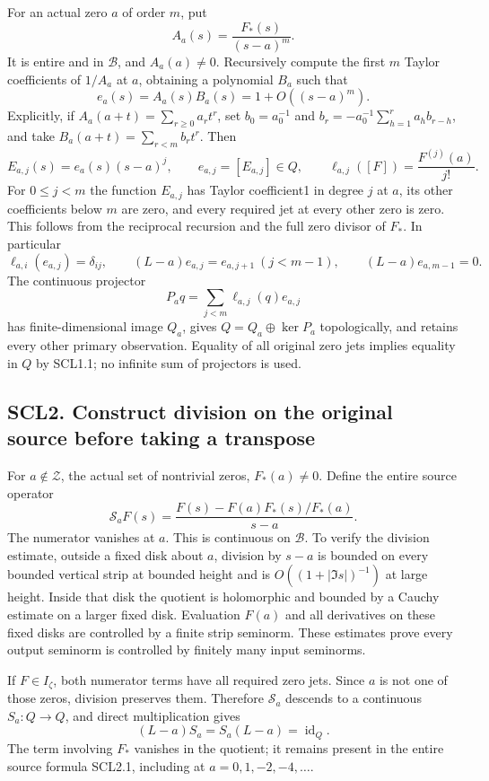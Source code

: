 For an actual zero \(a\) of order \(m\), put \[
 A_a(s)=\frac{F_*(s)}{(s-a)^m}.
\] It is entire and in \(\mathcal B\), and \(A_a(a)\ne0\). Recursively
compute the first \(m\) Taylor coefficients of \(1/A_a\) at \(a\),
obtaining a polynomial \(B_a\) such that \[
 e_a(s)=A_a(s)B_a(s)=1+O((s-a)^m).
\] Explicitly, if \(A_a(a+t)=\sum_{r\ge0}a_rt^r\), set \(b_0=a_0^{-1}\)
and \(b_r=-a_0^{-1}\sum_{h=1}^ra_hb_{r-h}\), and take
\(B_a(a+t)=\sum_{r<m}b_rt^r\). Then \[
 E_{a,j}(s)=e_a(s)(s-a)^j,\qquad
 e_{a,j}=[E_{a,j}]\in Q,\qquad
 \ell_{a,j}([F])=\frac{F^{(j)}(a)}{j!}.
 \tag{SCL1.6}
\] For \(0\le j<m\) the function \(E_{a,j}\) has Taylor coefficient1 in
degree \(j\) at \(a\), its other coefficients below \(m\) are zero, and
every required jet at every other zero is zero. This follows from the
reciprocal recursion and the full zero divisor of \(F_*\). In particular
\[
 \ell_{a,i}(e_{a,j})=\delta_{ij},\qquad
 (L-a)e_{a,j}=e_{a,j+1}\ (j<m-1),\qquad
 (L-a)e_{a,m-1}=0.
 \tag{SCL1.7}
\] The continuous projector \[
 P_aq=\sum_{j<m}\ell_{a,j}(q)e_{a,j}
 \tag{SCL1.8}
\] has finite-dimensional image \(Q_a\), gives \(Q=Q_a\oplus\ker P_a\)
topologically, and retains every other primary observation. Equality of
all original zero jets implies equality in \(Q\) by SCL1.1; no infinite
sum of projectors is used.

\subsection{SCL2. Construct division on the original source before
taking a
transpose}\label{scl2.-construct-division-on-the-original-source-before-taking-a-transpose}

For \(a\notin\mathscr Z\), the actual set of nontrivial zeros,
\(F_*(a)\ne0\). Define the entire source operator \[
 \mathscr S_aF(s)=
 \frac{F(s)-F(a)F_*(s)/F_*(a)}{s-a}.
 \tag{SCL2.1}
\] The numerator vanishes at \(a\). This is continuous on
\(\mathcal B\). To verify the division estimate, outside a fixed disk
about \(a\), division by \(s-a\) is bounded on every bounded vertical
strip at bounded height and is \(O((1+|\Im s|)^{-1})\) at large height.
Inside that disk the quotient is holomorphic and bounded by a Cauchy
estimate on a larger fixed disk. Evaluation \(F(a)\) and all derivatives
on these fixed disks are controlled by a finite strip seminorm. These
estimates prove every output seminorm is controlled by finitely many
input seminorms.

If \(F\in I_\zeta\), both numerator terms have all required zero jets.
Since \(a\) is not one of those zeros, division preserves them.
Therefore \(\mathscr S_a\) descends to a continuous \(S_a:Q\to Q\), and
direct multiplication gives \[
 (L-a)S_a=S_a(L-a)=\operatorname{id}_Q.
 \tag{SCL2.2}
\] The term involving \(F_*\) vanishes in the quotient; it remains
present in the entire source formula SCL2.1, including at
\(a=0,1,-2,-4,\ldots\).

